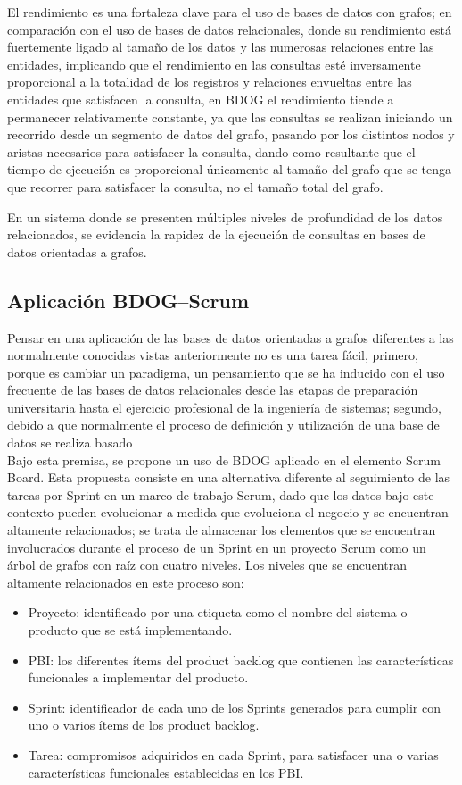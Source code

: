 \documentclass[preprint,12pt]{elsarticle}
\begin{document}
El rendimiento es una fortaleza clave para el uso de bases de datos con grafos; en comparación con el uso de bases de datos relacionales, donde su rendimiento está fuertemente ligado al tamaño de los datos y las numerosas relaciones entre las entidades, implicando que el rendimiento en las consultas esté inversamente proporcional a la totalidad de los registros y relaciones envueltas entre las entidades que satisfacen la consulta, en BDOG el rendimiento tiende a permanecer  relativamente constante, ya que las consultas se realizan iniciando un recorrido desde un segmento de datos del grafo, pasando por los distintos nodos y aristas necesarios para satisfacer la consulta, dando como resultante que el tiempo de ejecución es proporcional únicamente al tamaño del grafo que se tenga que recorrer para satisfacer la consulta, no el tamaño total del grafo.

En un sistema donde se presenten múltiples niveles de profundidad de los datos relacionados, se evidencia la rapidez de la ejecución de consultas en bases de datos orientadas a grafos. \\

\subsection{\textbf{Aplicación BDOG–Scrum}}
Pensar en una aplicación de las bases de datos orientadas a grafos diferentes a las normalmente conocidas vistas anteriormente no es una tarea fácil, primero, porque es cambiar un paradigma, un pensamiento que se ha inducido con el uso frecuente de las bases de datos relacionales desde las etapas de preparación universitaria hasta el ejercicio profesional de la ingeniería de sistemas; segundo, debido a que normalmente el proceso de definición y utilización de una base de datos se realiza basado\\

Bajo esta premisa, se propone un uso de BDOG aplicado en el elemento Scrum Board. Esta
propuesta consiste en una alternativa diferente al seguimiento de las tareas por Sprint en un marco de trabajo Scrum, dado que los datos bajo este contexto pueden evolucionar a medida que evoluciona el negocio y se encuentran altamente relacionados; se trata de almacenar los elementos que se encuentran involucrados durante el proceso de un Sprint en un proyecto Scrum como un árbol de grafos con raíz con cuatro niveles. Los niveles que se encuentran altamente relacionados en este proceso son:
\begin{itemize}
\item Proyecto: identificado por una etiqueta como el nombre del sistema o producto que se está implementando.
\item PBI: los diferentes ítems del product backlog que contienen las características funcionales a implementar del producto.
\item Sprint: identificador de cada uno de los Sprints generados para cumplir con uno o varios ítems de los product backlog.
\item Tarea: compromisos adquiridos en cada Sprint, para satisfacer una o varias características funcionales establecidas en los PBI.
\end{itemize}
\end{document}
